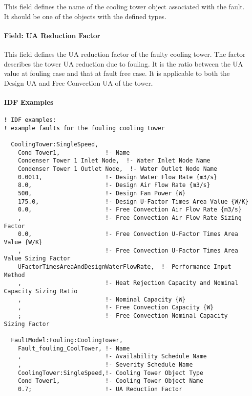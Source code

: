 This field defines the name of the cooling tower object associated with the fault. It should be one of the objects with the defined types.

\paragraph{Field: UA Reduction Factor}\label{field-ua-reduction-factor}

This field defines the UA reduction factor of the faulty cooling tower. The factor describes the tower UA reduction due to fouling. It is the ratio between the UA value at fouling case and that at fault free case. It is applicable to both the Design UA and Free Convection UA of the tower.

\paragraph{IDF Examples}

\begin{lstlisting}
! IDF examples:
! example faults for the fouling cooling tower

  CoolingTower:SingleSpeed,
    Cond Tower1,             !- Name
    Condenser Tower 1 Inlet Node,  !- Water Inlet Node Name
    Condenser Tower 1 Outlet Node,  !- Water Outlet Node Name
    0.0011,                  !- Design Water Flow Rate {m3/s}
    8.0,                     !- Design Air Flow Rate {m3/s}
    500,                     !- Design Fan Power {W}
    175.0,                   !- Design U-Factor Times Area Value {W/K}
    0.0,                     !- Free Convection Air Flow Rate {m3/s}
    ,                        !- Free Convection Air Flow Rate Sizing Factor
    0.0,                     !- Free Convection U-Factor Times Area Value {W/K}
    ,                        !- Free Convection U-Factor Times Area Value Sizing Factor
    UFactorTimesAreaAndDesignWaterFlowRate,  !- Performance Input Method
    ,                        !- Heat Rejection Capacity and Nominal Capacity Sizing Ratio
    ,                        !- Nominal Capacity {W}
    ,                        !- Free Convection Capacity {W}
    ;                        !- Free Convection Nominal Capacity Sizing Factor

  FaultModel:Fouling:CoolingTower,
    Fault_fouling_CoolTower, !- Name
    ,                        !- Availability Schedule Name
    ,                        !- Severity Schedule Name
    CoolingTower:SingleSpeed,!- Cooling Tower Object Type
    Cond Tower1,             !- Cooling Tower Object Name
    0.7;                     !- UA Reduction Factor

\end{lstlisting}


